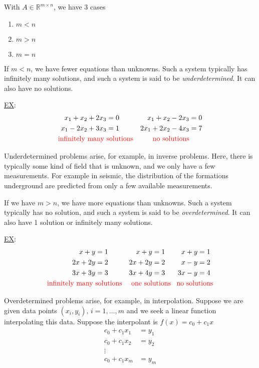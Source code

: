 With $A\in\mathbb{R}^{m\times n}$, we have 3 cases

\begin{center}
	\begin{enumerate}[1)]
		\item $m<n$
		\item $m>n$
		\item $m=n$
	\end{enumerate}
\end{center}

If $m<n$, we have fewer equations than unknowns. 
Such a system typically has infinitely many solutions, 
and such a system is said to be \emph{underdetermined}. 
It can also have no solutions. 

\underline{EX}:
\begin{align*}
    x_1 + x_2 + 2x_3 &= 0 & x_1 + x_2 - 2x_3 &= 0\\
    x_1 - 2x_2 + 3x_3 &= 1 & 2x_1 +2x_2 - 4x_3&=7\\
    \text{\textcolor{red}{infinitely many }}&\text{\textcolor{red}{solutions}}
    & \text{\textcolor{red}{no solutions}}
\end{align*}

Underdetermined problems arise, for example, in inverse problems. 
Here, there is typically some kind of field that is unknown, 
and we only have a few measurements. 
For example in seismic, the distribution of the formations underground 
are predicted from only a few available measurements. 

If we have $m>n$, we have more equations than unknowns. 
Such a system typically has no solution, 
and such a system is said to be \emph{overdetermined}. 
It can also have 1 solution or infinitely many solutions. 


\underline{EX}:
\begin{align*}
    x+y&=1 & x+y&=1 & x+y&=1 \\
    2x+2y&=2 & 2x+2y&=2 & x-y&=2 \\
    3x+3y&=3 & 3x+4y&=3 & 3x-y&=4 \\
    \text{\textcolor{red}{infinitely many }}&\text{\textcolor{red}{solutions}}
    & &\hspace{-3em}\text{\textcolor{red}{one solutions}}
    & &\hspace{-3em}\text{\textcolor{red}{no solutions}}
\end{align*}

Overdetermined problems arise, for example, in interpolation. 
Suppose we are given data points $(x_i, y_i),\, i=1, \ldots, m$ 
and we seek a linear function interpolating this data.  
Suppose the interpolant is $f(x) = c_0 + c_1 x$
%
\begin{align*}
    c_0 + c_1x_1 &= y_1 \\
    c_0 + c_1x_2 &= y_2 \\
    \vdots\\
    c_0+c_1x_m &= y_m
\end{align*}


